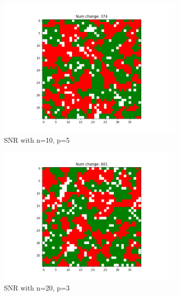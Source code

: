 \documentclass[11pt]{article}
\begin{document}
\begin{figure}[h]
\begin{subfigure}{0.14\textwidth}
			\includegraphics[width=\linewidth]{final_social_n10p5.png}
			\caption{\centering SNR with n=10, p=5}
		\end{subfigure}\hfill
		\begin{subfigure}{0.14\textwidth}
			\includegraphics[width=\linewidth]{final_social_n20p3.png}
			\caption{\centering SNR with n=20, p=3}
		\end{subfigure}\hfill
		\begin{subfigure}{0.14\textwidth}

\end{subfigure}
\end{figure}
\end{document}
